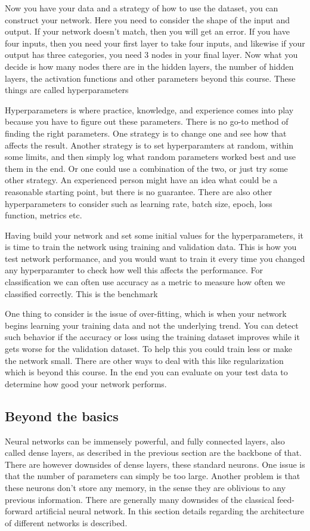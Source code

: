 \documentclass[11pt,a4paper]{article} %
\numberwithin{equation}{section}
\begin{document}
    	Now you have your data and a strategy of how to use the dataset, you can construct your network. Here you need to consider the shape of the input and output. If your network doesn't match, then you will get an error. If you have four inputs, then you need your first layer to take four inputs, and likewise if your output has three categories, you need 3 nodes in your final layer. Now what you decide is how many nodes there are in the hidden layers, the number of hidden layers, the activation functions and other parameters beyond this course. These things are called hyperparameters
    	
    	Hyperparameters is where practice, knowledge, and experience comes into play because you have to figure out these parameters. There is no go-to method of finding the right parameters. One strategy is to change one and see how that affects the result. Another strategy is to set hyperparamters at random, within some limits, and then simply log what random parameters worked best and use them in the end. Or one could use a combination of the two, or just try some other strategy. An experienced person might have an idea what could be a reasonable starting point, but there is no guarantee. There are also other hyperparameters to consider such as learning rate, batch size, epoch, loss function, metrics etc.
    	
    	Having build your network and set some initial values for the hyperparameters, it is time to train the network using training and validation data. This is how you test network performance, and you would want to train it every time you changed any hyperparamter to check how well this affects the performance. For classification we can often use accuracy as a metric to measure how often we classified correctly. This is the benchmark
    	
    	One thing to consider is the issue of over-fitting, which is when your network begins learning your training data and not the underlying trend. You can detect such behavior if the accuracy or loss using the training dataset improves while it gets worse for the validation dataset. To help this you could train less or make the network small. There are other ways to deal with this like regularization which is beyond this course. In the end you can evaluate on your test data to determine how good your network performs.
    	
    \subsection{Beyond the basics}
    	Neural networks can be immensely powerful, and fully connected layers, also called dense layers, as described in the previous section are the backbone of that. There are however downsides of dense layers, these standard neurons. One issue is that the number of parameters can simply be too large. Another problem is that these neurons don't store any memory, in the sense they are oblivious to any previous information. There are generally many downsides of the classical feed-forward artificial neural network. In this section details regarding the architecture of different networks is described.
    	
\end{document}
